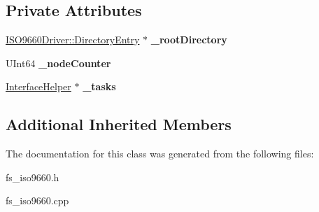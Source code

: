 \subsection*{Private Attributes}
\begin{DoxyCompactItemize}
\item 
\mbox{\label{class_file_system___i_s_o9660_a19d8e4f30b4347fea84b70d7e02f7788}} 
\hyperlink{class_i_s_o9660_driver_1_1_directory_entry}{I\+S\+O9660\+Driver\+::\+Directory\+Entry} $\ast$ {\bfseries \+\_\+root\+Directory}
\item 
\mbox{\label{class_file_system___i_s_o9660_aa4c08b17b136cfaaae06b113335d6f14}} 
U\+Int64 {\bfseries \+\_\+node\+Counter}
\item 
\mbox{\label{class_file_system___i_s_o9660_a53e621cc6d53322d1ea81adcb8c5fa1e}} 
\hyperlink{class_interface_helper}{Interface\+Helper} $\ast$ {\bfseries \+\_\+tasks}
\end{DoxyCompactItemize}
\subsection*{Additional Inherited Members}


The documentation for this class was generated from the following files\+:\begin{DoxyCompactItemize}
\item 
fs\+\_\+iso9660.\+h\item 
fs\+\_\+iso9660.\+cpp\end{DoxyCompactItemize}

